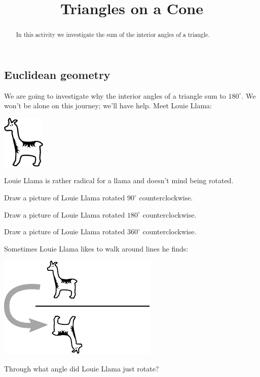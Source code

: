 \documentclass{ximera}
\title{Triangles on a Cone}
\begin{document}
\begin{abstract}
In this activity we investigate the sum of the interior angles of a triangle.
\end{abstract}
\maketitle


\subsection*{Euclidean geometry}

We are going to investigate why the interior angles of a triangle sum
to $180^\circ$. We won't be alone on this journey; we'll have help.
Meet Louie Llama:
\begin{image}
\includegraphics[height=1in]{llama.pdf}
\end{image}

Louie Llama is rather radical for a llama and doesn't mind being
rotated.

\begin{question} 
Draw a picture of Louie Llama rotated $90^\circ$ counterclockwise.
\end{question}

\begin{question} 
Draw a picture of Louie Llama rotated $180^\circ$ counterclockwise.
\end{question}

\begin{question} 
Draw a picture of Louie Llama rotated $360^\circ$ counterclockwise.
\end{question}

\begin{question} Sometimes Louie Llama likes to walk around lines he finds:
\begin{image}
\includegraphics{llamaLines.pdf}
\end{image}
Through what angle did Louie Llama just rotate?
\end{question}
\end{document}
